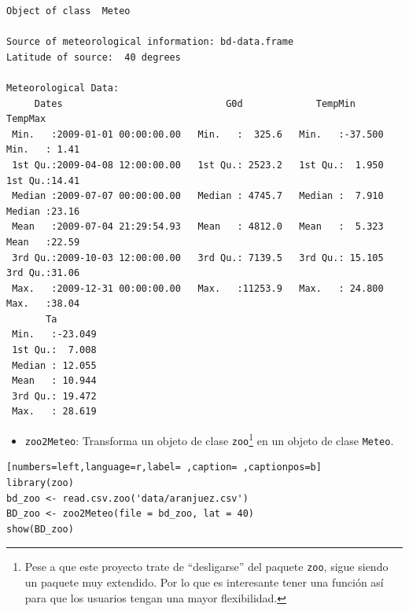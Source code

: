 \begin{verbatim}
Object of class  Meteo 

Source of meteorological information: bd-data.frame 
Latitude of source:  40 degrees

Meteorological Data:
     Dates                             G0d             TempMin           TempMax     
 Min.   :2009-01-01 00:00:00.00   Min.   :  325.6   Min.   :-37.500   Min.   : 1.41  
 1st Qu.:2009-04-08 12:00:00.00   1st Qu.: 2523.2   1st Qu.:  1.950   1st Qu.:14.41  
 Median :2009-07-07 00:00:00.00   Median : 4745.7   Median :  7.910   Median :23.16  
 Mean   :2009-07-04 21:29:54.93   Mean   : 4812.0   Mean   :  5.323   Mean   :22.59  
 3rd Qu.:2009-10-03 12:00:00.00   3rd Qu.: 7139.5   3rd Qu.: 15.105   3rd Qu.:31.06  
 Max.   :2009-12-31 00:00:00.00   Max.   :11253.9   Max.   : 24.800   Max.   :38.04  
       Ta         
 Min.   :-23.049  
 1st Qu.:  7.008  
 Median : 12.055  
 Mean   : 10.944  
 3rd Qu.: 19.472  
 Max.   : 28.619
\end{verbatim}

\begin{itemize}
\item \texttt{zoo2Meteo}: Transforma un objeto de clase \texttt{zoo}\footnote{Pese a que este proyecto trate de ``desligarse'' del paquete \texttt{zoo}, sigue siendo un paquete muy extendido. Por lo que es interesante tener una función así para que los usuarios tengan una mayor flexibilidad.} en un objeto de clase \texttt{Meteo}.
\end{itemize}
\begin{lstlisting}[numbers=left,language=r,label= ,caption= ,captionpos=b]
library(zoo)
bd_zoo <- read.csv.zoo('data/aranjuez.csv')
BD_zoo <- zoo2Meteo(file = bd_zoo, lat = 40)
show(BD_zoo)
\end{lstlisting}

